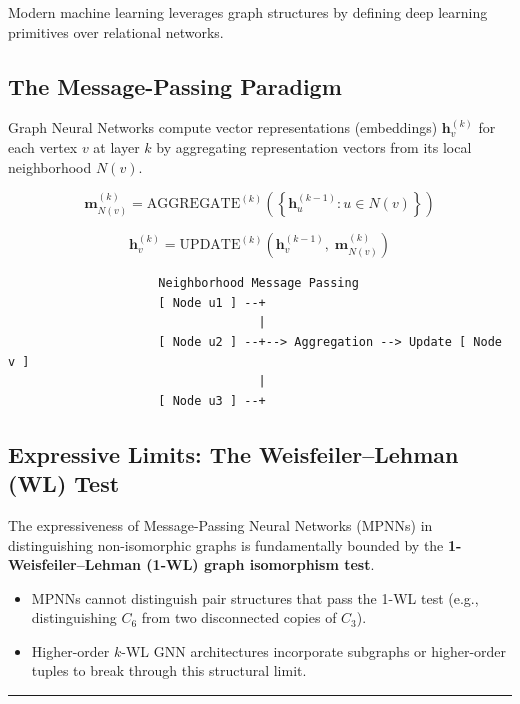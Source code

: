 \documentclass[
]{book}
\providecommand{\tightlist}{%
  \setlength{\itemsep}{0pt}\setlength{\parskip}{0pt}}
\theoremstyle{definition}
\theoremstyle{definition}
\theoremstyle{definition}
\theoremstyle{definition}
\theoremstyle{remark}
\begin{document}
Modern machine learning leverages graph structures by defining deep learning primitives over relational networks.

\subsection{The Message-Passing Paradigm}\label{the-message-passing-paradigm}

Graph Neural Networks compute vector representations (embeddings) \(\mathbf{h}_v^{(k)}\) for each vertex \(v\) at layer \(k\) by aggregating representation vectors from its local neighborhood \(N(v)\).

\[\mathbf{m}_{N(v)}^{(k)} = \text{AGGREGATE}^{(k)} \left( \left\{ \mathbf{h}_u^{(k-1)} : u \in N(v) \right\} \right)\]

\[\mathbf{h}_v^{(k)} = \text{UPDATE}^{(k)} \left( \mathbf{h}_v^{(k-1)}, \; \mathbf{m}_{N(v)}^{(k)} \right)\]

\begin{verbatim}
                     Neighborhood Message Passing
                     [ Node u1 ] --+
                                   |
                     [ Node u2 ] --+--> Aggregation --> Update [ Node v ]
                                   |
                     [ Node u3 ] --+
\end{verbatim}

\subsection{Expressive Limits: The Weisfeiler--Lehman (WL) Test}\label{expressive-limits-the-weisfeilerlehman-wl-test}

The expressiveness of Message-Passing Neural Networks (MPNNs) in distinguishing non-isomorphic graphs is fundamentally bounded by the \textbf{1-Weisfeiler--Lehman (1-WL) graph isomorphism test}.

\begin{itemize}
\tightlist
\item
  MPNNs cannot distinguish pair structures that pass the 1-WL test (e.g., distinguishing \(C_6\) from two disconnected copies of \(C_3\)).
\item
  Higher-order \(k\)-WL GNN architectures incorporate subgraphs or higher-order tuples to break through this structural limit.
\end{itemize}

\begin{center}\rule{0.5\linewidth}{0.5pt}\end{center}
\end{document}
